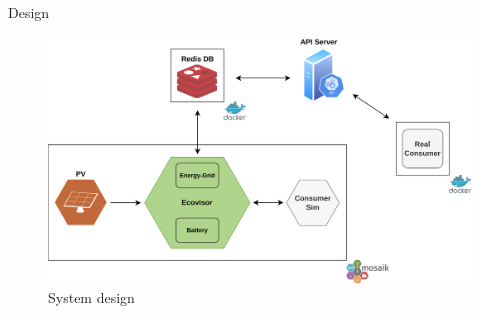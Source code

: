 \begin{frame}{Design}
    \begin{figure}
    \centering
    \includegraphics[height=.68\textheight]{../../system_design}
    \caption{System design}
    \label{fig:system_design}
    \end{figure}
\end{frame}
